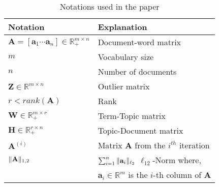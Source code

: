 \begin{table}
\begin{tabular}{ l | l }
\hline
Notation & Explanation\\ \hline
  $\mathbf{A}=[\mathbf{a}_1 \cdots \mathbf{a}_n] \in \mathbb{R}_+^{m \times n}$ & Document-word matrix  \\
  $m$ & Vocabulary size \\
  $n$ & Number of documents \\
  $\mathbf{Z} \in  \mathbb{R}^{m \times n}$ & Outlier matrix\\
  $r < rank(\mathbf{A})$ & Rank \\
  $\mathbf{W} \in \mathbb{R}_+^{m \times r}$ & Term-Topic matrix\\
  $\mathbf{H} \in \mathbb{R}_+^{r \times n}$&  Topic-Document matrix \\
  $\mathbf{A}^{(i)}$ & Matrix $\mathbf{A}$ from the $i^{th}$ iteration \\ 
  $\|\mathbf{A}\|_{1,2}$ & $\sum_{i=1}^n\|\mathbf{a}_i\|_{\ell_2}$ $\ell_{12}$-Norm where,\\  &  $\mathbf{a}_i \in \mathbb{R}^m$ is the $i$-th column of $\mathbf{A}$ \\
  \hline
  
\end{tabular}
\caption{Notations used in the paper} \label{table:notations}
\end{table}
